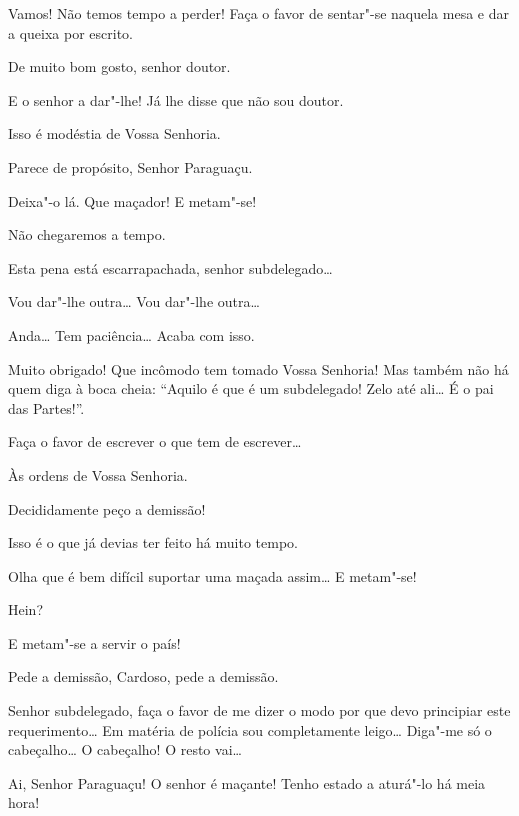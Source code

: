  Vamos! Não temos tempo a perder! Faça o favor de sentar"-se
naquela mesa e dar a queixa por
escrito.

 De muito bom gosto, senhor doutor. 

 E o senhor a dar"-lhe! Já lhe disse que não sou doutor.

 Isso é modéstia de Vossa Senhoria.

 Parece de propósito, Senhor Paraguaçu.

 Deixa"-o lá.  Que
maçador! E metam"-se!

 Não chegaremos a tempo.

  Esta pena está escarrapachada, senhor
subdelegado\ldots{}

 Vou dar"-lhe outra\ldots{} Vou dar"-lhe outra\ldots{}

 Anda\ldots{} Tem paciência\ldots{} Acaba com isso. 

 Muito obrigado! Que incômodo tem tomado Vossa Senhoria! Mas
também não há quem diga à
boca cheia: “Aquilo é que é um subdelegado! Zelo até ali\ldots{} É o pai das
Partes!”.

 Faça o favor de escrever o que tem de escrever\ldots{}

 Às ordens de Vossa Senhoria. 

  Decididamente peço
a demissão!

 Isso é o que já devias ter feito há muito tempo.

 Olha que é bem difícil suportar uma maçada assim\ldots{} E
metam"-se!

 Hein?

 E metam"-se a servir o país!

 Pede a demissão, Cardoso, pede a demissão.

  Senhor subdelegado, faça o favor de
me dizer o modo por que devo principiar este
requerimento\ldots{} Em matéria de polícia sou completamente leigo\ldots{} Diga"-me
só o cabeçalho\ldots{} O cabeçalho!
O resto vai\ldots{}

 Ai, Senhor Paraguaçu! O senhor é maçante! Tenho estado a
aturá"-lo há meia hora!

